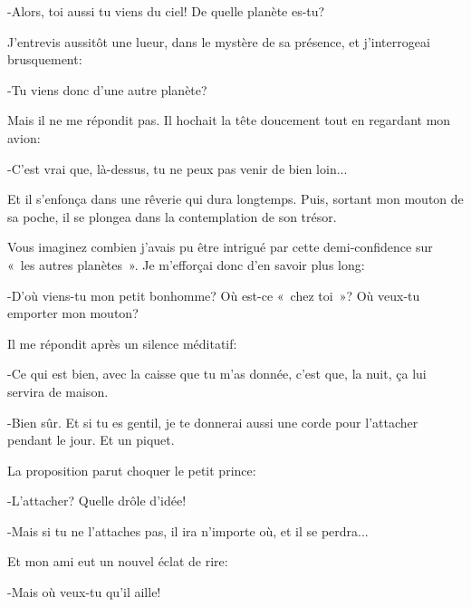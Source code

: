 \documentclass{report}
\begin{document}
-Alors, toi aussi tu viens du ciel! De quelle planète es-tu?

J'entrevis aussitôt une lueur, dans le mystère de sa présence, et j'interrogeai brusquement:

-Tu viens donc d'une autre planète?

Mais il ne me répondit pas. Il hochait la tête doucement tout en regardant mon avion:

-C'est vrai que, là-dessus, tu ne peux pas venir de bien loin...


Et il s'enfonça dans une rêverie qui dura longtemps. Puis, sortant mon mouton de sa poche, il se plongea dans la contemplation de son trésor.

Vous imaginez combien j'avais pu être intrigué par cette demi-confidence sur «~les autres planètes~». Je m'efforçai donc d'en savoir plus long:

-D'où viens-tu mon petit bonhomme? Où est-ce «~chez toi~»? Où veux-tu emporter mon mouton?

Il me répondit après un silence méditatif:

-Ce qui est bien, avec la caisse que tu m'as donnée, c'est que, la nuit, ça lui servira de maison.

-Bien sûr. Et si tu es gentil, je te donnerai aussi une corde pour l'attacher pendant le jour. Et un piquet.

La proposition parut choquer le petit prince:

-L'attacher? Quelle drôle d'idée!

-Mais si tu ne l'attaches pas, il ira n'importe où, et il se perdra...

Et mon ami eut un nouvel éclat de rire:

-Mais où veux-tu qu'il aille!
\end{document}
